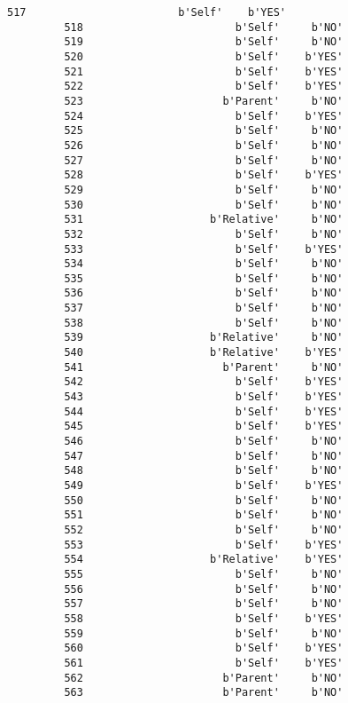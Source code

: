 \documentclass[11pt]{article}
\begin{document}
\begin{Verbatim}[commandchars=\\\{\}]
         517                        b'Self'    b'YES'  
         518                        b'Self'     b'NO'  
         519                        b'Self'     b'NO'  
         520                        b'Self'    b'YES'  
         521                        b'Self'    b'YES'  
         522                        b'Self'    b'YES'  
         523                      b'Parent'     b'NO'  
         524                        b'Self'    b'YES'  
         525                        b'Self'     b'NO'  
         526                        b'Self'     b'NO'  
         527                        b'Self'     b'NO'  
         528                        b'Self'    b'YES'  
         529                        b'Self'     b'NO'  
         530                        b'Self'     b'NO'  
         531                    b'Relative'     b'NO'  
         532                        b'Self'     b'NO'  
         533                        b'Self'    b'YES'  
         534                        b'Self'     b'NO'  
         535                        b'Self'     b'NO'  
         536                        b'Self'     b'NO'  
         537                        b'Self'     b'NO'  
         538                        b'Self'     b'NO'  
         539                    b'Relative'     b'NO'  
         540                    b'Relative'    b'YES'  
         541                      b'Parent'     b'NO'  
         542                        b'Self'    b'YES'  
         543                        b'Self'    b'YES'  
         544                        b'Self'    b'YES'  
         545                        b'Self'    b'YES'  
         546                        b'Self'     b'NO'  
         547                        b'Self'     b'NO'  
         548                        b'Self'     b'NO'  
         549                        b'Self'    b'YES'  
         550                        b'Self'     b'NO'  
         551                        b'Self'     b'NO'  
         552                        b'Self'     b'NO'  
         553                        b'Self'    b'YES'  
         554                    b'Relative'    b'YES'  
         555                        b'Self'     b'NO'  
         556                        b'Self'     b'NO'  
         557                        b'Self'     b'NO'  
         558                        b'Self'    b'YES'  
         559                        b'Self'     b'NO'  
         560                        b'Self'    b'YES'  
         561                        b'Self'    b'YES'  
         562                      b'Parent'     b'NO'  
         563                      b'Parent'     b'NO'  

\end{Verbatim}
\end{document}
